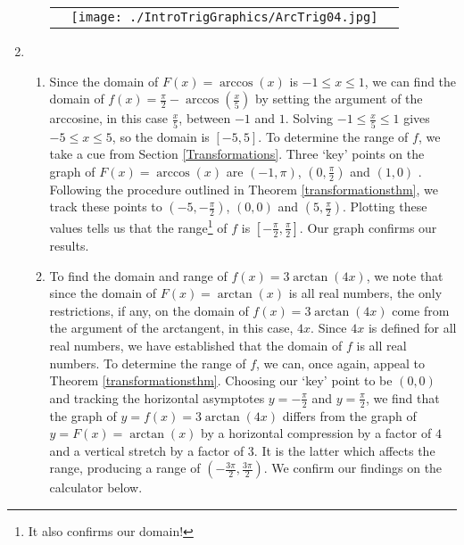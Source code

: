 \begin{ex}
\begin{enumerate}
\begin{enumerate}
\begin{tabular}{m{2.5in}m{1in}m{2.5in}}
&

\texttt{[image: ./IntroTrigGraphics/ArcTrig04.jpg]} \\

\end{tabular}

\end{enumerate}

\newpage

\item \begin{enumerate}

\item  Since the domain of $F(x) = \arccos(x)$ is $-1 \leq x \leq 1$, we can find the domain of $f(x) = \frac{\pi}{2} - \arccos\left(\frac{x}{5}\right)$ by setting the argument of the arccosine, in this case $\frac{x}{5}$, between $-1$ and $1$. Solving  $-1 \leq \frac{x}{5} \leq 1$ gives $-5 \leq x \leq 5$, so the domain is $[-5,5]$.  To determine the range of $f$, we take a cue from Section \ref{Transformations}. Three `key' points on the graph of $F(x) = \arccos(x)$ are  $(-1, \pi)$, $\left(0, \frac{\pi}{2}\right)$ and $(1,0)$ . Following the procedure outlined in Theorem \ref{transformationsthm}, we track these points to $\left(-5, -\frac{\pi}{2}\right)$, $(0, 0)$ and $\left(5, \frac{\pi}{2}\right)$. Plotting these values tells us that the range\footnote{It also confirms our domain!} of $f$ is $\left[-\frac{\pi}{2}, \frac{\pi}{2}\right]$. Our graph confirms our results.


\item  To find the domain and range of $f(x) = 3\arctan\left(4x \right)$, we note that since the domain of $F(x) = \arctan(x)$ is all real numbers, the only restrictions, if any, on the domain of  $f(x) = 3\arctan\left(4x \right)$ come from the argument of the arctangent, in this case, $4x$.  Since $4x$ is defined for all real numbers, we have established that the domain of $f$ is all real numbers.  To determine the range of $f$, we can, once again, appeal to Theorem \ref{transformationsthm}.  Choosing our `key' point to be $(0,0)$ and tracking the horizontal asymptotes $y = -\frac{\pi}{2}$ and $y= \frac{\pi}{2}$, we find that the graph of $y = f(x) = 3\arctan\left(4x \right)$ differs from the graph of $y = F(x) = \arctan(x)$ by a horizontal compression by a factor of $4$ and a vertical stretch by a factor of $3$.  It is the latter which affects the range, producing a range of $\left(-\frac{3\pi}{2}, \frac{3\pi}{2} \right)$.  We confirm our findings on the calculator below.


\end{enumerate}
\end{enumerate}
\end{ex}
